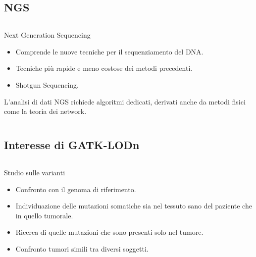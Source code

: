 \documentclass{beamer}
\begin{document}
\subsection{NGS}
\begin{frame}
\begin{columns}
\begin{column}{0.8\linewidth}
\begin{block}{Next Generation Sequencing}
\begin{itemize}
\item Comprende le nuove tecniche per il sequenziamento del 
DNA.
\item Tecniche più rapide e meno costose dei metodi precedenti.
\item Shotgun Sequencing.
\end{itemize}
\end{block}
\begin{block}{}
L'analisi di dati NGS richiede algoritmi dedicati, derivati anche da metodi fisici come la teoria dei network.
\end{block}
\end{column}
\end{columns}
\end{frame}

\subsection{Interesse di GATK-LODn}
\begin{frame}
\begin{columns}
\begin{column}{0.8\linewidth}
\begin{block}{Studio sulle varianti}
\begin{itemize}
\item Confronto con il genoma di riferimento.
\item Individuazione delle mutazioni somatiche sia nel tessuto sano del paziente che in quello tumorale.
\item Ricerca di quelle mutazioni che sono presenti solo nel tumore.
\item Confronto tumori simili tra diversi soggetti.
\end{itemize}
\end{block}
\end{column}
\end{columns}
\end{frame}
\end{document}
